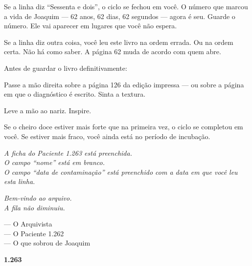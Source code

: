 \noindent Se a linha diz ``Sessenta e dois'', o ciclo se fechou em você. O número que marcou a vida de Joaquim --- 62 anos, 62 dias, 62 segundos --- agora é seu. Guarde o número. Ele vai aparecer em lugares que você não espera.

\noindent Se a linha diz outra coisa, você leu este livro na ordem errada. Ou na ordem certa. Não há como saber. A página 62 muda de acordo com quem abre.

\vspace{1em}
\noindent Antes de guardar o livro definitivamente:

\noindent Passe a mão direita sobre a página 126 da edição impressa --- ou sobre a página em que o diagnóstico é escrito. Sinta a textura.

\noindent Leve a mão ao nariz. Inspire.

\noindent Se o cheiro doce estiver mais forte que na primeira vez, o ciclo se completou em você. Se estiver mais fraco, você ainda está no período de incubação.

\vspace{1.5em}
\begin{center}
\textit{A ficha do Paciente 1.263 está preenchida.}\\
\textit{O campo ``nome'' está em branco.}\\
\textit{O campo ``data de contaminação'' está preenchido com a data em que você leu esta linha.}

\vspace{1.5em}
\textit{Bem-vindo ao arquivo.}\\
\textit{A fila não diminuiu.}

\vspace{1.5em}
--- O Arquivista\\
--- O Paciente 1.262\\
--- O que sobrou de Joaquim

\vspace{2em}
\textbf{1.263}
\end{center}

\clearpage
